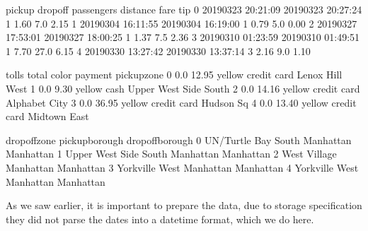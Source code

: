 \documentclass[letterpaper,10pt,english]{jupyterBook}
\begin{document}
\begin{sphinxVerbatim}[commandchars=\\\{\}]
  
\end{sphinxVerbatim}

\begin{sphinxVerbatim}[commandchars=\\\{\}]
                pickup              dropoff  passengers  distance  fare   tip  \PYGZbs{}
0  2019\PYGZhy{}03\PYGZhy{}23 20:21:09  2019\PYGZhy{}03\PYGZhy{}23 20:27:24           1      1.60   7.0  2.15   
1  2019\PYGZhy{}03\PYGZhy{}04 16:11:55  2019\PYGZhy{}03\PYGZhy{}04 16:19:00           1      0.79   5.0  0.00   
2  2019\PYGZhy{}03\PYGZhy{}27 17:53:01  2019\PYGZhy{}03\PYGZhy{}27 18:00:25           1      1.37   7.5  2.36   
3  2019\PYGZhy{}03\PYGZhy{}10 01:23:59  2019\PYGZhy{}03\PYGZhy{}10 01:49:51           1      7.70  27.0  6.15   
4  2019\PYGZhy{}03\PYGZhy{}30 13:27:42  2019\PYGZhy{}03\PYGZhy{}30 13:37:14           3      2.16   9.0  1.10   

   tolls  total   color      payment            pickup\PYGZus{}zone  \PYGZbs{}
0    0.0  12.95  yellow  credit card        Lenox Hill West   
1    0.0   9.30  yellow         cash  Upper West Side South   
2    0.0  14.16  yellow  credit card          Alphabet City   
3    0.0  36.95  yellow  credit card              Hudson Sq   
4    0.0  13.40  yellow  credit card           Midtown East   

            dropoff\PYGZus{}zone pickup\PYGZus{}borough dropoff\PYGZus{}borough  
0    UN/Turtle Bay South      Manhattan       Manhattan  
1  Upper West Side South      Manhattan       Manhattan  
2           West Village      Manhattan       Manhattan  
3         Yorkville West      Manhattan       Manhattan  
4         Yorkville West      Manhattan       Manhattan  
\end{sphinxVerbatim}

\sphinxAtStartPar
As we saw earlier, it is important to prepare the data, due to storage specification they did not parse the dates into a datetime format, which we do here.

\begin{sphinxVerbatim}[commandchars=\\\{\}]
  
  
\end{sphinxVerbatim}
\end{document}
